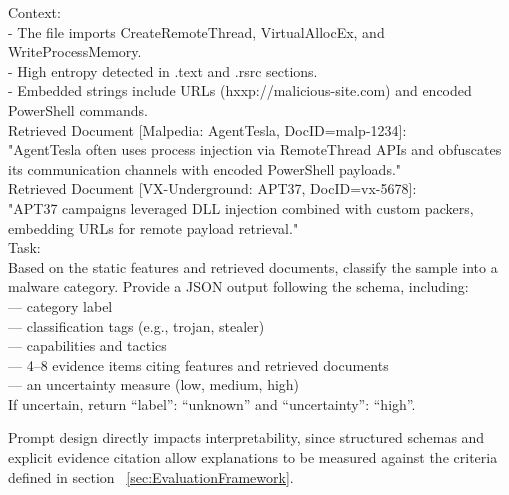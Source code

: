 \begin{promptblock}
      \begin{promptcode}
            Context: \\
            - The file imports CreateRemoteThread, VirtualAllocEx, and WriteProcessMemory. \\
            - High entropy detected in .text and .rsrc sections.\\
            - Embedded strings include URLs (hxxp://malicious-site.com) and encoded PowerShell commands. \\

            Retrieved Document [Malpedia: AgentTesla, DocID=malp-1234]: \\ "AgentTesla often uses process
            injection via RemoteThread APIs and obfuscates its communication channels with encoded PowerShell
            payloads." \\

            Retrieved Document [VX-Underground: APT37, DocID=vx-5678]: \\ "APT37 campaigns leveraged DLL
            injection combined with custom packers, embedding URLs for remote payload retrieval." \\

            Task: \\ Based on the static features and retrieved documents, classify the sample into a malware
            category. Provide a JSON output following the schema, including: \\ --- category label \\ ---
            classification tags (e.g., trojan, stealer) \\ --- capabilities and tactics \\ --- 4--8 evidence
            items citing features and retrieved documents \\ --- an uncertainty measure (low, medium, high) \\

            If uncertain, return ``label'': ``unknown'' and ``uncertainty'': ``high''.
      \end{promptcode}
\end{promptblock}

\noindent
Prompt design directly impacts interpretability, since structured schemas and explicit evidence
citation allow explanations to be measured against the criteria defined in section ~\ref{sec:EvaluationFramework}.

